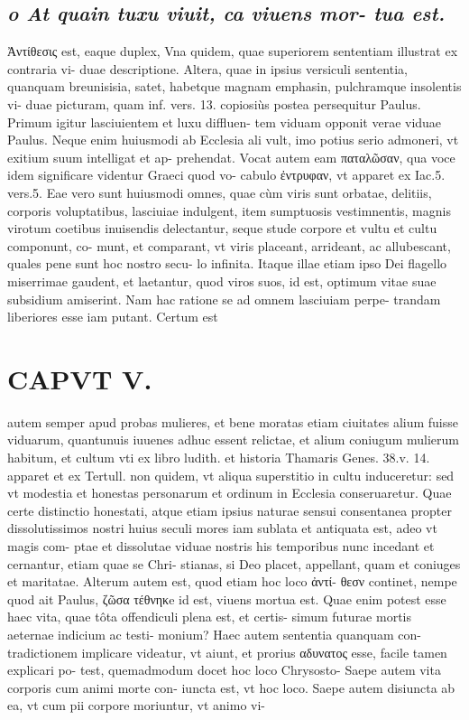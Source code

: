 \documentclass{article}
\begin{document}
\begin{pages}
\subsection*{\textit{o At quain tuxu viuit, ca viuens mor- tua est. }}\pstart Ἀντίθεσις est, eaque duplex, Vna quidem, quae superiorem sententiam illustrat ex contraria vi- duae descriptione. Altera, quae in ipsius versiculi sententia, quanquam breunisisia, satet, habetque magnam emphasin, pulchramque insolentis vi- duae picturam, quam inf. vers. 13. copiosiùs postea persequitur Paulus.  \pend\pstart Primum igitur lasciuientem et luxu diffluen- tem viduam opponit verae viduae Paulus. Neque enim huiusmodi ab Ecclesia ali vult, imo potius serio admoneri, vt exitium suum intelligat et ap- prehendat. Vocat autem eam παταλῶσαν, qua voce idem significare videntur Graeci quod vo- cabulo ἐντρυφαν, vt apparet ex Iac.5. vers.5. Eae vero sunt huiusmodi omnes, quae cùm viris sunt orbatae, delitiis, corporis voluptatibus, lasciuiae indulgent, item sumptuosis vestimnentis, magnis virotum coetibus inuisendis delectantur, seque stude corpore et vultu et cultu componunt, co- munt, et comparant, vt viris placeant, arrideant, ac allubescant, quales pene sunt hoc nostro secu- lo infinita. Itaque illae etiam ipso Dei flagello miserrimae gaudent, et laetantur, quod viros suos, id est, optimum vitae suae subsidium amiserint. Nam hac ratione se ad omnem lasciuiam perpe- trandam liberiores esse iam putant. Certum est  \pend
\section*{CAPVT  V. }
\marginpar{[ p.263 ]}\pstart autem semper apud probas mulieres, et bene moratas etiam ciuitates alium fuisse viduarum, quantunuis iuuenes adhuc essent relictae, et alium coniugum mulierum habitum, et cultum vti ex libro ludith. et historia Thamaris Genes. 38.v. 14. apparet et ex Tertull. non quidem, vt aliqua superstitio in cultu induceretur: sed vt modestia et honestas personarum et ordinum in Ecclesia conseruaretur. Quae certe distinctio honestati, atque etiam ipsius naturae sensui consentanea propter dissolutissimos nostri huius seculi mores iam sublata et antiquata est, adeo vt magis com- ptae et dissolutae viduae nostris his temporibus nunc incedant et cernantur, etiam quae se Chri- stianas, si Deo placet, appellant, quam et coniuges et maritatae.  \pend\pstart Alterum autem est, quod etiam hoc loco ἀντί- θεσν continet, nempe quod ait Paulus, ζῶσα τέθνηκe id est, viuens mortua est. Quae enim potest esse haec vita, quae tôta offendiculi plena est, et certis- simum futurae mortis aeternae indicium ac testi- monium? Haec autem sententia quanquam con- tradictionem implicare videatur, vt aiunt, et prorius αδυνατος esse, facile tamen explicari po- test, quemadmodum docet hoc loco Chrysosto-  \pend\pstart Saepe autem vita corporis cum animi morte con- iuncta est, vt hoc loco. Saepe autem disiuncta ab ea, vt cum pii corpore moriuntur, vt animo vi-  \pend

\end{pages}
\end{document}
